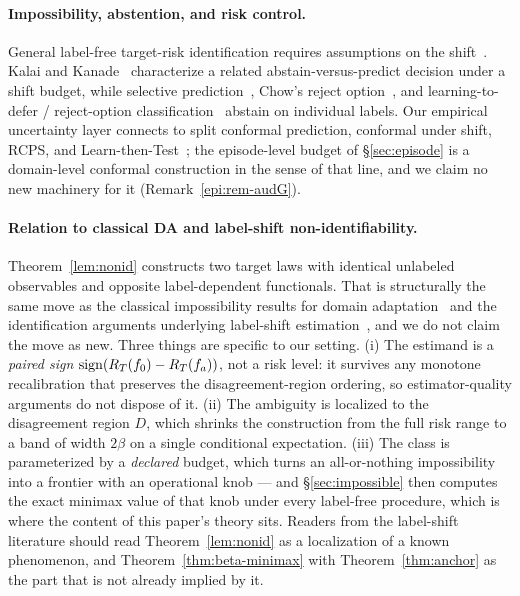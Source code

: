 \paragraph{Impossibility, abstention, and risk control.} General label-free target-risk identification requires assumptions on the shift~\cite{garg2022atc,steinhardt2016,bendavid2010theory,rosenfeld2023dis2}. Kalai and Kanade~\cite{kalai2021abstain} characterize a related abstain-versus-predict decision under a shift budget, while selective prediction~\cite{geifman2017selective}, Chow's reject option~\cite{chow1970reject}, and learning-to-defer / reject-option classification~\cite{cortes2016boosting,madras2018learntodefer} abstain on individual labels. Our empirical uncertainty layer connects to split conformal prediction, conformal under shift, RCPS, and Learn-then-Test~\cite{tibshirani2019conformal,gibbs2021adaptive,barber2023beyond,bates2021rcps,angelopoulos2025ltt}; the episode-level budget of \S\ref{sec:episode} is a domain-level conformal construction in the sense of that line, and we claim no new machinery for it (Remark~\ref{epi:rem-audG}).

\paragraph{Relation to classical DA and label-shift non-identifiability.}
Theorem~\ref{lem:nonid} constructs two target laws with identical unlabeled observables and opposite
label-dependent functionals. That is structurally the same move as the classical impossibility
results for domain adaptation~\cite{bendavid2010theory,bendavid2012hardness} and the identification
arguments underlying label-shift estimation~\cite{lipton2018bbse,garg2020labelshift}, and we do not
claim the move as new. Three things are specific to our setting. (i) The estimand is a \emph{paired
sign} $\operatorname{sign}(R_T(f_0)-R_T(f_a))$, not a risk level: it survives any monotone recalibration that
preserves the disagreement-region ordering, so estimator-quality arguments do not dispose of it.
(ii) The ambiguity is localized to the disagreement region $D$, which shrinks the construction from
the full risk range to a band of width $2\beta$ on a single conditional expectation. (iii) The class
is parameterized by a \emph{declared} budget, which turns an all-or-nothing impossibility into a
frontier with an operational knob --- and \S\ref{sec:impossible} then computes the exact minimax
value of that knob under every label-free procedure, which is where the content of this paper's
theory sits. Readers from the label-shift literature should read Theorem~\ref{lem:nonid} as a
localization of a known phenomenon, and Theorem~\ref{thm:beta-minimax} with
Theorem~\ref{thm:anchor} as the part that is not already implied by it.

